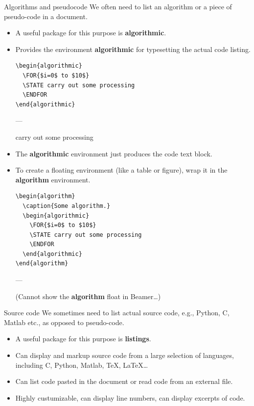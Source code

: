 \documentclass[english]{beamer}
\begin{document}
\begin{frame}{\insertsection}{Algorithms and
    pseudocode}
  We often need to list an algorithm or a piece of pseudo-code in a
  document.
  \begin{itemize}
  \item A useful package for this purpose is \textbf{algorithmic}.
  \item Provides the environment \textbf{algorithmic} for typesetting
    the actual code listing.
\begin{verbatim}
\begin{algorithmic}
  \FOR{$i=0$ to $10$}
  \STATE carry out some processing
  \ENDFOR
\end{algorithmic}
\end{verbatim}
    ---
    \begin{algorithmic}
       \STATE carry out some processing
      \ENDFOR
    \end{algorithmic}
  \item The \textbf{algorithmic} environment just produces the code
    text block.
  \item To create a floating environment (like a table or figure),
    wrap it in the \textbf{algorithm} environment.
\begin{verbatim}
\begin{algorithm}
  \caption{Some algorithm.}
  \begin{algorithmic}
    \FOR{$i=0$ to $10$}
    \STATE carry out some processing
    \ENDFOR
  \end{algorithmic}
\end{algorithm}
\end{verbatim}
    ---

    (Cannot show the \textbf{algorithm} float in Beamer\ldots)
  \end{itemize}
\end{frame}

\begin{frame}{\insertsection}{Source code}
  We sometimes need to list actual source code, e.g., Python, C,
  Matlab etc., as opposed to pseudo-code.
  \begin{itemize}
  \item A useful package for this purpose is \textbf{listings}.
  \item Can display and markup source code from a large selection of
    languages, including C, Python, Matlab, TeX, LaTeX\ldots
  \item Can list code pasted in the document or read code from an
    external file.
  \item Highly custumizable, can display line numbers, can display
    excerpts of code.
  \end{itemize}
\end{frame}
\end{document}
